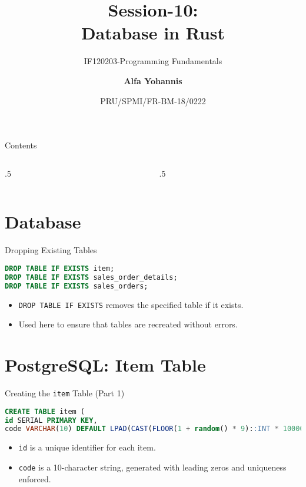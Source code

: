 \documentclass[aspectratio=169, table]{beamer}
\subtitle{IF120203-Programming Fundamentals}
\title{Session-10:\\\LARGE{Database in Rust}\\ \vspace{15pt}}
\date[Serial]{\scriptsize {PRU/SPMI/FR-BM-18/0222}}
\author[Pradita]{\small{\textbf{Alfa Yohannis}}}
\begin{document}
\frame{\titlepage}

\begin{frame}{Contents}
	\vspace{15pt}
	\begin{columns}[t]
		\begin{column}{.5\textwidth}
			\tableofcontents[sections={1-12}]
		\end{column}
		\begin{column}{.5\textwidth}
			\tableofcontents[sections={13-24}]
		\end{column}
	\end{columns}
\end{frame}


\section{Database}
\begin{frame}[fragile]{Dropping Existing Tables}

\begin{lstlisting}[language=Sql]
DROP TABLE IF EXISTS item;
DROP TABLE IF EXISTS sales_order_details;
DROP TABLE IF EXISTS sales_orders;
\end{lstlisting}

\begin{itemize}
\item \texttt{DROP TABLE IF EXISTS} removes the specified table if it exists.
\item Used here to ensure that tables are recreated without errors.
\end{itemize}
\end{frame}

\section{PostgreSQL: Item Table}
\begin{frame}[fragile]{Creating the \texttt{item} Table (Part 1)}
\vspace{15pt}
\begin{lstlisting}[language=Sql]
CREATE TABLE item (
id SERIAL PRIMARY KEY,
code VARCHAR(10) DEFAULT LPAD(CAST(FLOOR(1 + random() * 9)::INT * 1000000000 + FLOOR(random() * 1000000000)::INT AS VARCHAR), 10, '0') NOT NULL UNIQUE,
\end{lstlisting}

\begin{itemize}
\item \texttt{id} is a unique identifier for each item.
\item \texttt{code} is a 10-character string, generated with leading zeros and uniqueness enforced.
\end{itemize}
\end{frame}
\end{document}
